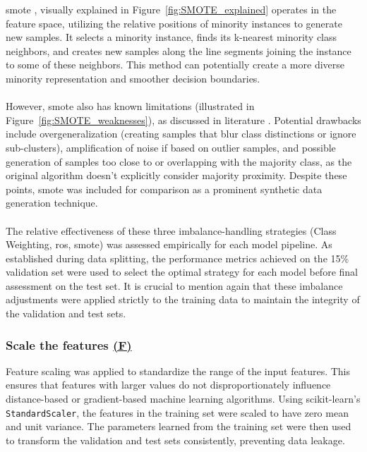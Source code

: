 \documentclass[12pt,a4paper]{report}
\begin{document}
\noindent
\gls{smote} \cite{Chawla2002SMOTE}, visually explained in Figure~\ref{fig:SMOTE_explained} operates in the feature space, utilizing the relative positions of minority instances to generate new samples. It selects a minority instance, finds its k-nearest minority class neighbors, and creates new samples along the line segments joining the instance to some of these neighbors. This method can potentially create a more diverse minority representation and smoother decision boundaries.\\
\\
However, \gls{smote} also has known limitations (illustrated in Figure~\ref{fig:SMOTE_weaknesses}), as discussed in literature \cite{Truong2022SMOTEVariants}. Potential drawbacks include overgeneralization (creating samples that blur class distinctions or ignore sub-clusters), amplification of noise if based on outlier samples, and possible generation of samples too close to or overlapping with the majority class, as the original algorithm doesn't explicitly consider majority proximity. Despite these points, \gls{smote} was included for comparison as a prominent synthetic data generation technique.\\
\\
The relative effectiveness of these three imbalance-handling strategies (Class Weighting, \gls{ros}, \gls{smote}) was assessed empirically for each model pipeline. As established during data splitting, the performance metrics achieved on the 15\% validation set were used to select the optimal strategy for each model before final assessment on the test set. It is crucial to mention again that these imbalance adjustments were applied strictly to the training data to maintain the integrity of the validation and test sets.

\subsubsection*{Scale the features \hyperref[fig:pipeline-1]{(F)}}
Feature scaling was applied to standardize the range of the input features. This ensures that features with larger values do not disproportionately influence distance-based or gradient-based machine learning algorithms. Using scikit-learn's \texttt{StandardScaler}, the features in the training set were scaled to have zero mean and unit variance. The parameters learned from the training set were then used to transform the validation and test sets consistently, preventing data leakage.
\end{document}
